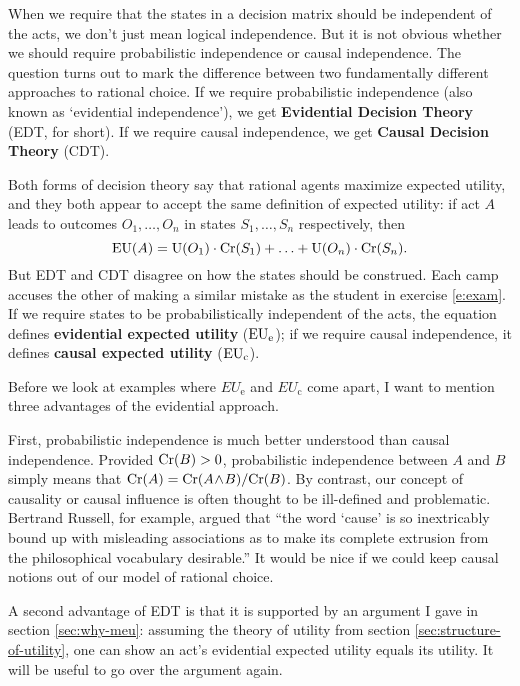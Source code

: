 When we require that the states in a decision matrix should be independent of
the acts, we don't just mean logical independence. But it is not obvious whether
we should require probabilistic independence or causal independence. The
question turns out to mark the difference between two fundamentally different
approaches to rational choice. If we require probabilistic independence (also
known as `evidential independence'), we get \textbf{Evidential Decision Theory}
(EDT, for short). If we require causal independence, we get \textbf{Causal
  Decision Theory} (CDT).


Both forms of decision theory say that rational agents maximize expected
utility, and they both appear to accept the same definition of expected utility:
if act $A$ leads to outcomes $O_1,\ldots,O_n$ in states $S_1,\ldots,S_n$
respectively, then
\[
\text{EU}(A) = \text{U}(O_1) \cdot \text{Cr}(S_1) + \ldots + \text{U}(O_n) \cdot \text{Cr}(S_n).
\]
But EDT and CDT disagree on how the states should be construed. Each camp
accuses the other of making a similar mistake as the student in exercise
\ref{e:exam}. If we require states to be probabilistically independent of the
acts, the equation defines \textbf{evidential expected utility} ($\text{EU}_\text{e}$); if we
require causal independence, it defines \textbf{causal expected utility}
($\text{EU}_\text{c}$).

Before we look at examples where $EU_\text{e}$ and $EU_\text{c}$ come apart, I
want to mention three advantages of the evidential approach.

First, probabilistic independence is much better understood than causal
independence. Provided $\text{Cr}(B) > 0$, probabilistic independence between $A$ and
$B$ simply means that $\text{Cr}(A) = \text{Cr}(A\!\land\!B)/\text{Cr}(B)$. By contrast, our concept
of causality or causal influence is often thought to be ill-defined and
problematic. Bertrand Russell, for example, argued that ``the word `cause' is so
inextricably bound up with misleading associations as to make its complete
extrusion from the philosophical vocabulary desirable.'' It would be nice if we
could keep causal notions out of our model of rational choice.

A second advantage of EDT is that it is supported by an argument I gave in
section \ref{sec:why-meu}: assuming the theory of utility from section
\ref{sec:structure-of-utility}, one can show an act's evidential expected
utility equals its utility. It will be useful to go over the argument again.

